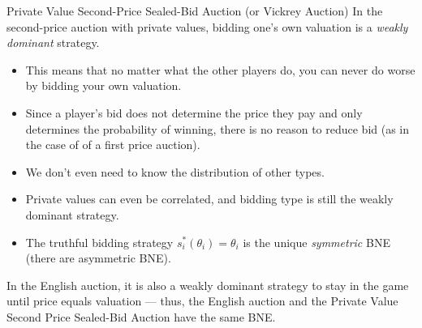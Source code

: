 \documentclass[10pt]{extarticle}
\begin{document}
  \begin{problem}{Private Value Second-Price Sealed-Bid Auction (or Vickrey Auction)}
    In the second-price auction with private values, bidding one's own valuation is a \textit{weakly dominant} strategy.
    \begin{itemize}
      \item This means that no matter what the other players do, you can never do worse by bidding your own valuation.
      \item Since a player's bid does not determine the price they pay and only determines the probability of winning, there is no reason to reduce bid (as in the case of of a first price auction).
      \item We don't even need to know the distribution of other types.
      \item Private values can even be correlated, and bidding type is still the weakly dominant strategy.
      \item The truthful bidding strategy $s_i^{\ast}(\theta_i) = \theta_i$ is the unique \textit{symmetric} BNE (there are asymmetric BNE).
    \end{itemize}
    In the English auction, it is also a weakly dominant strategy to stay in the game until price equals valuation --- thus, the English auction and the Private Value Second Price Sealed-Bid Auction have the same BNE.
  \end{problem}
\end{document}
